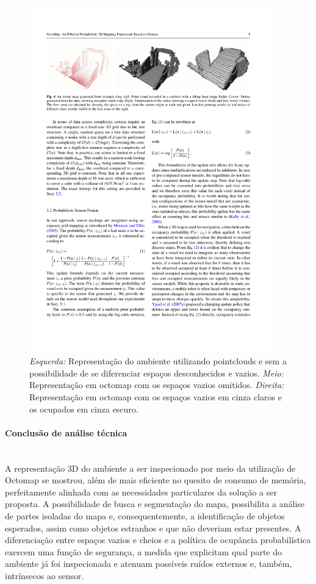 \begin{itemize}
    \begin{figure}[h!]
     \centering
    \includegraphics[width=0.95\textwidth]{figs/3d/free}
    \caption{\textit{Esquerda:} Representação do ambiente utilizando pointclouds e sem a possibilidade de se diferenciar espaços desconhecidos e vazios. \textit{Meio:} Representação em octomap com os espaços vazios omitidos. \textit{Direita:} Representação em octomap com os espaços vazios em cinza claros e os ocupados em cinza escuro.}
    \label{fig:free}
\end{figure}
\end{itemize}

\paragraph{Conclusão de análise técnica}\mbox{}\\
A representação 3D do ambiente a ser inspecionado por meio da utilização de Octomap se mostrou, além de mais eficiente no quesito de consumo de memória, perfeitamente alinhada com as necessidades particulares da solução a ser proposta. A possibilidade de busca e segmentação do mapa, possibilita a análise de partes isoladas do mapa e, consequentemente, a identificação de objetos esperados, assim como objetos estranhos e que não deveriam estar presentes. A diferenciação entre espaços vazios e cheios e a política de ocupância probabilística exercem uma função de segurança, a medida que explicitam qual parte do ambiente já foi inspecionada e atenuam possíveis ruídos externos e, também, intrínsecos ao sensor.

